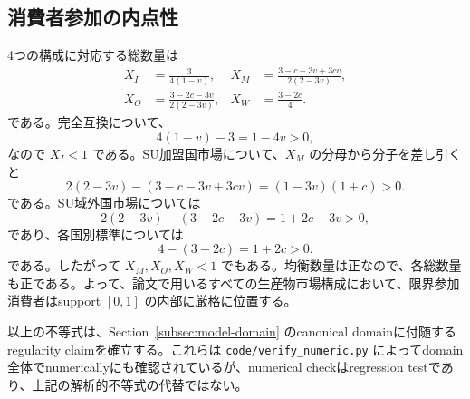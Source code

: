 \subsection{消費者参加の内点性}

4つの構成に対応する総数量は
\begin{align}
X_I&=\frac{3}{4(1-v)},&
X_M&=\frac{3-c-3v+3cv}{2(2-3v)},\\
X_O&=\frac{3-2c-3v}{2(2-3v)},&
X_W&=\frac{3-2c}{4}.
\end{align}
である。完全互換について、
\[
4(1-v)-3=1-4v>0,
\]
なので $X_I<1$ である。SU加盟国市場について、$X_M$ の分母から分子を差し引くと
\[
2(2-3v)-(3-c-3v+3cv)
=(1-3v)(1+c)>0.
\]
である。SU域外国市場については
\[
2(2-3v)-(3-2c-3v)
=1+2c-3v>0,
\]
であり、各国別標準については
\[
4-(3-2c)=1+2c>0.
\]
である。したがって $X_M,X_O,X_W<1$ でもある。均衡数量は正なので、各総数量も正である。よって、論文で用いるすべての生産物市場構成において、限界参加消費者はsupport $[0,1]$ の内部に厳格に位置する。

以上の不等式は、Section~\ref{subsec:model-domain} のcanonical domainに付随するregularity claimを確立する。これらは \texttt{code/verify\_numeric.py} によってdomain全体でnumericallyにも確認されているが、numerical checkはregression testであり、上記の解析的不等式の代替ではない。
